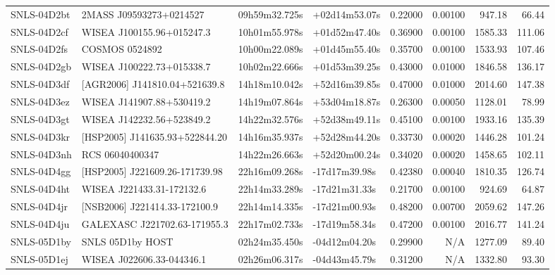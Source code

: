 \begin{longtable}{llllrrrr}
SNLS-04D2bt      &         2MASS J09593273+0214527 &   09h59m32.725s &   +02d14m53.07s &  0.22000 &  0.00100 &   947.18 &       66.44 \\
SNLS-04D2cf      &       WISEA J100155.96+015247.3 &   10h01m55.978s &   +01d52m47.40s &  0.36900 &  0.00100 &  1585.33 &      111.06 \\
SNLS-04D2fs      &                  COSMOS 0524892 &   10h00m22.089s &   +01d45m55.40s &  0.35700 &  0.00100 &  1533.93 &      107.46 \\
SNLS-04D2gb      &       WISEA J100222.73+015338.7 &   10h02m22.666s &   +01d53m39.25s &  0.43000 &  0.01000 &  1846.58 &      136.17 \\
SNLS-04D3df      &  [AGR2006] J141810.04+521639.8  &   14h18m10.042s &   +52d16m39.85s &  0.47000 &  0.01000 &  2014.60 &      147.38 \\
SNLS-04D3ez      &       WISEA J141907.88+530419.2 &   14h19m07.864s &   +53d04m18.87s &  0.26300 &  0.00050 &  1128.01 &       78.99 \\
SNLS-04D3gt      &       WISEA J142232.56+523849.2 &   14h22m32.576s &   +52d38m49.11s &  0.45100 &  0.00100 &  1933.16 &      135.39 \\
SNLS-04D3kr      &  [HSP2005] J141635.93+522844.20 &   14h16m35.937s &   +52d28m44.20s &  0.33730 &  0.00020 &  1446.28 &      101.24 \\
SNLS-04D3nh      &                 RCS 06040400347 &   14h22m26.663s &   +52d20m00.24s &  0.34020 &  0.00020 &  1458.65 &      102.11 \\
SNLS-04D4gg      &  [HSP2005] J221609.26-171739.98 &   22h16m09.268s &   -17d17m39.98s &  0.42380 &  0.00040 &  1810.35 &      126.74 \\
SNLS-04D4ht      &       WISEA J221433.31-172132.6 &   22h14m33.289s &   -17d21m31.33s &  0.21700 &  0.00100 &   924.69 &       64.87 \\
SNLS-04D4jr      &  [NSB2006] J221414.33-172100.9  &   22h14m14.335s &   -17d21m00.93s &  0.48200 &  0.00700 &  2059.62 &      147.26 \\
SNLS-04D4ju      &  GALEXASC J221702.63-171955.3   &   22h17m02.733s &   -17d19m58.34s &  0.47200 &  0.00100 &  2016.77 &      141.24 \\
SNLS-05D1by      &                SNLS 05D1by HOST &   02h24m35.450s &   -04d12m04.20s &  0.29900 &      N/A &  1277.09 &       89.40 \\
SNLS-05D1ej      &       WISEA J022606.33-044346.1 &   02h26m06.317s &   -04d43m45.79s &  0.31200 &      N/A &  1332.80 &       93.30 \\

\end{longtable}
